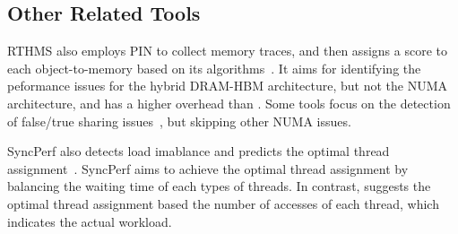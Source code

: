 



\subsection{Other Related Tools}
RTHMS also employs PIN to collect memory traces, and then assigns a score to each object-to-memory based on its algorithms~\cite{RTHMS}. It aims for identifying the peformance issues for the hybrid DRAM-HBM architecture, but not the NUMA architecture, and has a higher overhead than \NP{}. Some tools focus on the detection of false/true sharing issues~\cite{Sheriff, Predator, Cheetah, DBLP:conf/ppopp/ChabbiWL18, helm2019perfmemplus}, but skipping other NUMA issues. 

SyncPerf also detects load imablance and predicts the optimal thread assignment~\cite{SyncPerf}. SyncPerf aims to achieve the optimal thread assignment by balancing the waiting time of each types of threads. In contrast, \NP{} suggests the optimal thread assignment based  the number of accesses of each thread, which indicates the actual workload. 





